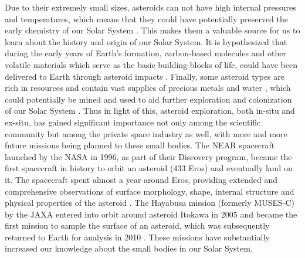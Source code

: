 Due to their extremely small sizes, asteroids can not have high internal pressures and temperatures, which means that they could have potentially preserved the early chemistry of our Solar System \parencite{hayabusaTouchdownDynamics}. This makes them a valuable source for us to learn about the history and origin of our Solar System. It is hypothesized that during the early years of Earth's formation, carbon-based molecules and other volatile materials which serve as the basic building-blocks of life, could have been delivered to Earth through asteroid impacts \parencite{jpl_asteroid_web}. Finally, some asteroid types are rich in resources and contain vast supplies of precious metals \parencite{asteroidPreciousMetalSource} and water \parencite{asteroidWaterSource}, which could potentially be mined and used to aid further exploration and colonization of our Solar System \parencite{jpl_asteroid_web}. Thus in light of this, asteroid exploration, both in-situ and ex-situ, has gained significant importance not only among the scientific community but among the private space industry as well, with more and more future missions being planned to these small bodies. The \gls{NEAR} spacecraft launched by the \gls{NASA} in 1996, as part of their Discovery program, became the first spacecraft in history to orbit an asteroid (433 Eros) and eventually land on it. The spacecraft spent almost a year around Eros, providing extended and comprehensive observations of surface morphology, shape, internal structure and physical properties of the asteroid \parencite{nearMission}. The Hayabusa mission (formerly MUSES-C) by the \gls{JAXA} entered into orbit around asteroid Itokawa in 2005 and became the first mission to sample the surface of an asteroid, which was subsequently returned to Earth for analysis in 2010 \parencite{yanoHayabusaTouchdown}. These missions have substantially increased our knowledge about the small bodies in our Solar System.
%
\newline\newline
%
